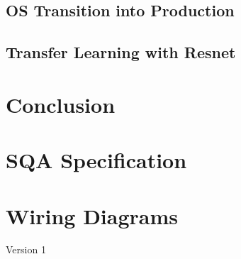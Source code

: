\documentclass[fleqn,twoside]{article}
\begin{document}
\subsection{OS Transition into Production}



\subsection{Transfer Learning with Resnet}










\newpage

\section{Conclusion}
















\newpage





\newpage
\appendix
\section{SQA Specification}
\label{app:sqa_specs}


\begin{minipage}[b]{0.9\linewidth}
	
\end{minipage}




\newpage

\section{Wiring Diagrams}
\label{app:wiring}

Version 1
\begin{minipage}[b]{0.9\linewidth}
	
\end{minipage}

%





\end{document}
